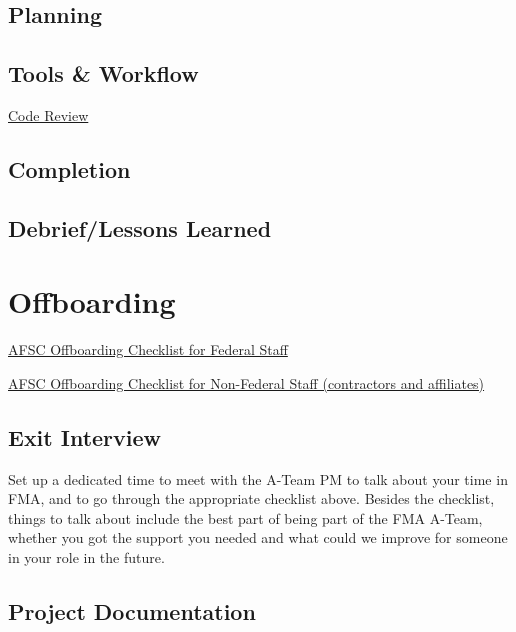 \documentclass[
  letterpaper,
  DIV=11,
  numbers=noendperiod]{scrreprt}
\begin{document}
\hypertarget{planning}{%
\section{Planning}\label{planning}}

\hypertarget{tools-workflow}{%
\section{Tools \& Workflow}\label{tools-workflow}}

\href{081-code-review.qmd}{Code Review}

\hypertarget{completion}{%
\section{Completion}\label{completion}}

\hypertarget{debrieflessons-learned}{%
\section{Debrief/Lessons Learned}\label{debrieflessons-learned}}


\hypertarget{offboarding}{%
\chapter{Offboarding}\label{offboarding}}

\href{https://drive.google.com/file/d/17hBFFWaAImoVNqHfPJmoAKqGqs8rD1Q2/view?usp=sharing}{AFSC
Offboarding Checklist for Federal Staff}

\href{https://drive.google.com/file/d/1BdNN2rvgwdyUAuk_9cOlRGw5_ik6K37Q/view?usp=sharing}{AFSC
Offboarding Checklist for Non-Federal Staff (contractors and
affiliates)}

\hypertarget{exit-interview}{%
\section{Exit Interview}\label{exit-interview}}

Set up a dedicated time to meet with the A-Team PM to talk about your
time in FMA, and to go through the appropriate checklist above. Besides
the checklist, things to talk about include the best part of being part
of the FMA A-Team, whether you got the support you needed and what could
we improve for someone in your role in the future.

\hypertarget{project-documentation}{%
\section{Project Documentation}\label{project-documentation}}
\end{document}
